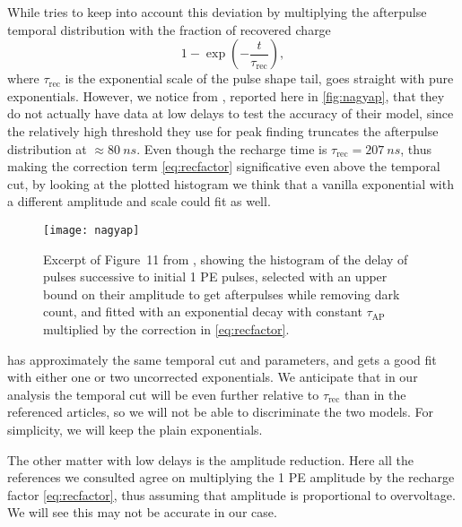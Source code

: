 While \cite[2]{nagy2014} tries to keep into account this deviation by
multiplying the afterpulse temporal distribution with the fraction of recovered
charge
%
\begin{equation}
    1 - \exp\left(-\frac{t}{\tau_\text{rec}}\right),
    \label{eq:recfactor}
\end{equation}
%
where $\tau_\text{rec}$ is the exponential scale of the pulse shape tail,
\cite[4]{garutti2014} goes straight with pure exponentials. However, we notice
from \cite[p.~5~fig.~11]{nagy2014}, reported here in \autoref{fig:nagyap}, that
they do not actually have data at low delays to test the accuracy of their
model, since the relatively high threshold they use for peak finding truncates
the afterpulse distribution at $\approx\SI{80}{ns}$. Even though the recharge
time is $\tau_\text{rec} = \SI{207}{ns}$, thus making the correction term
\eqref{eq:recfactor} significative even above the temporal cut, by looking at
the plotted histogram we think that a vanilla exponential with a different
amplitude and scale could fit as well.

\begin{figure}
    
    \centering
    \texttt{[image: nagyap]}
    
    \caption{\label{fig:nagyap} Excerpt of Figure~11 from \cite{nagy2014},
    showing the histogram of the delay of pulses successive to initial 1 PE
    pulses, selected with an upper bound on their amplitude to get afterpulses
    while removing dark count, and fitted with an exponential decay with
    constant $\tau_\text{AP}$ multiplied by the correction in
    \autoref{eq:recfactor}.}
    
\end{figure}

\cite{garutti2014} has approximately the same temporal cut and parameters, and
gets a good fit with either one or two uncorrected exponentials. We anticipate
that in our analysis the temporal cut will be even further relative to
$\tau_\text{rec}$ than in the referenced articles, so we will not be able to
discriminate the two models. For simplicity, we will keep the plain
exponentials.

The other matter with low delays is the amplitude reduction. Here all the
references we consulted agree on multiplying the 1 PE amplitude by the recharge
factor \eqref{eq:recfactor}, thus assuming that amplitude is proportional to
overvoltage. We will see this may not be accurate in our case.


